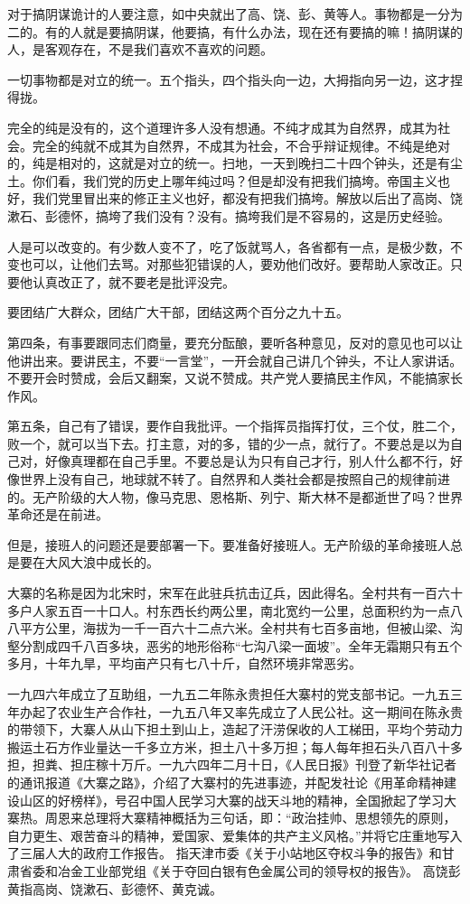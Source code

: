 对于搞阴谋诡计的人要注意，如中央就出了高、饶、彭、黄等人。事物都是一分为二的。有的人就是要搞阴谋，他要搞，有什么办法，现在还有要搞的嘛！搞阴谋的人，是客观存在，不是我们喜欢不喜欢的问题。

一切事物都是对立的统一。五个指头，四个指头向一边，大拇指向另一边，这才捏得拢。

完全的纯是没有的，这个道理许多人没有想通。不纯才成其为自然界，成其为社会。完全的纯就不成其为自然界，不成其为社会，不合乎辩证规律。不纯是绝对的，纯是相对的，这就是对立的统一。扫地，一天到晚扫二十四个钟头，还是有尘土。你们看，我们党的历史上哪年纯过吗？但是却没有把我们搞垮。帝国主义也好，我们党里冒出来的修正主义也好，都没有把我们搞垮。解放以后出了高岗、饶漱石、彭德怀，搞垮了我们没有？没有。搞垮我们是不容易的，这是历史经验。

人是可以改变的。有少数人变不了，吃了饭就骂人，各省都有一点，是极少数，不变也可以，让他们去骂。对那些犯错误的人，要劝他们改好。要帮助人家改正。只要他认真改正了，就不要老是批评没完。

要团结广大群众，团结广大干部，团结这两个百分之九十五。

第四条，有事要跟同志们商量，要充分酝酿，要听各种意见，反对的意见也可以让他讲出来。要讲民主，不要“一言堂”，一开会就自己讲几个钟头，不让人家讲话。不要开会时赞成，会后又翻案，又说不赞成。共产党人要搞民主作风，不能搞家长作风。

第五条，自己有了错误，要作自我批评。一个指挥员指挥打仗，三个仗，胜二个，败一个，就可以当下去。打主意，对的多，错的少一点，就行了。不要总是以为自己对，好像真理都在自己手里。不要总是认为只有自己才行，别人什么都不行，好像世界上没有自己，地球就不转了。自然界和人类社会都是按照自己的规律前进的。无产阶级的大人物，像马克思、恩格斯、列宁、斯大林不是都逝世了吗？世界革命还是在前进。

但是，接班人的问题还是要部署一下。要准备好接班人。无产阶级的革命接班人总是要在大风大浪中成长的。


\begin{maonote}
大寨的名称是因为北宋时，宋军在此驻兵抗击辽兵，因此得名。全村共有一百六十多户人家五百一十口人。村东西长约两公里，南北宽约一公里，总面积约为一点八八平方公里，海拔为一千一百六十二点六米。全村共有七百多亩地，但被山梁、沟壑分割成四千八百多块，恶劣的地形俗称“七沟八梁一面坡”。全年无霜期只有五个多月，十年九旱，平均亩产只有七八十斤，自然环境非常恶劣。

一九四六年成立了互助组，一九五二年陈永贵担任大寨村的党支部书记。一九五三年办起了农业生产合作社，一九五八年又率先成立了人民公社。这一期间在陈永贵的带领下，大寨人从山下担土到山上，造起了汗涝保收的人工梯田，平均个劳动力搬运土石方作业量达一千多立方米，担土八十多万担；每人每年担石头八百八十多担，担粪、担庄稼十万斤。一九六四年二月十日，《人民日报》刊登了新华社记者的通讯报道《大寨之路》，介绍了大寨村的先进事迹，并配发社论《用革命精神建设山区的好榜样》，号召中国人民学习大寨的战天斗地的精神，全国掀起了学习大寨热。周恩来总理将大寨精神概括为三句话，即：“政治挂帅、思想领先的原则，自力更生、艰苦奋斗的精神，爱国家、爱集体的共产主义风格。”并将它庄重地写入了三届人大的政府工作报告。
指天津市委《关于小站地区夺权斗争的报告》和甘肃省委和冶金工业部党组《关于夺回白银有色金属公司的领导权的报告》。
高饶彭黄指高岗、饶漱石、彭德怀、黄克诚。
\end{maonote}
